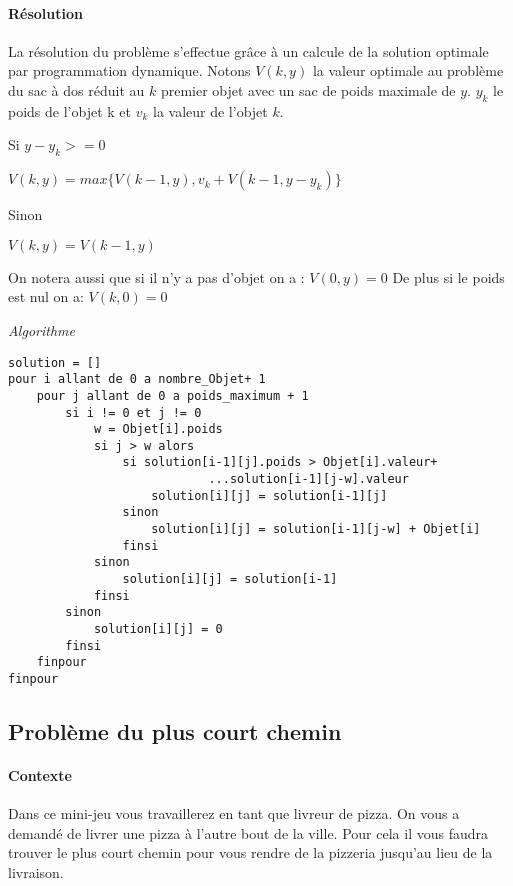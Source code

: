         \paragraph{Résolution}
            La résolution du problème s'effectue grâce à un calcule de la solution optimale
            par programmation dynamique. Notons $V(k,y)$ la valeur optimale au problème du sac à dos
            réduit au $k$ premier objet avec un sac de poids maximale de $y$.
            $y_{k}$ le poids de l'objet k et $v_{k}$ la valeur de l'objet $k$.

            Si $ y - y_{k} >= 0 $

                $V(k,y) = max\{ V(k-1,y)  ,v_{k} + V(k-1,y-y_{k}) \}$

            Sinon

                $V(k,y) = V(k-1,y)$

            On notera aussi que si il n'y a pas d'objet on a : $V(0,y) = 0$
            De plus si le poids est nul on a: $V(k,0) = 0$

	\emph{Algorithme}

\begin{lstlisting}
solution = []
pour i allant de 0 a nombre_Objet+ 1
    pour j allant de 0 a poids_maximum + 1
        si i != 0 et j != 0
            w = Objet[i].poids
            si j > w alors
                si solution[i-1][j].poids > Objet[i].valeur+
                            ...solution[i-1][j-w].valeur
                    solution[i][j] = solution[i-1][j]
                sinon
                    solution[i][j] = solution[i-1][j-w] + Objet[i]
                finsi
            sinon
                solution[i][j] = solution[i-1]
            finsi
        sinon
            solution[i][j] = 0
        finsi
    finpour
finpour
\end{lstlisting}


\subsection{Problème du plus court chemin}

        \paragraph{Contexte}
	    Dans ce mini-jeu vous travaillerez en tant que livreur de pizza. On vous a demandé de 
	    livrer  une pizza à l'autre bout de la ville. Pour cela il vous faudra trouver le plus court chemin
	    pour vous rendre de la pizzeria jusqu'au lieu de la livraison.
